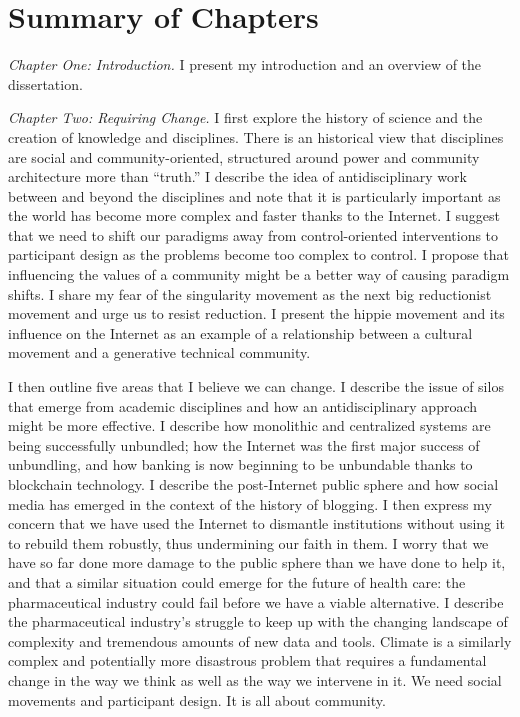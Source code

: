 \section{Summary of Chapters}

\emph{Chapter One: Introduction.} I present my introduction and an overview of the dissertation.

\emph{Chapter Two: Requiring Change.} I first explore the history of science and the creation of knowledge and disciplines. There is an historical view that disciplines are social and community-oriented, structured around power and community architecture more than ``truth.'' I describe the idea of antidisciplinary work between and beyond the disciplines and note that it is particularly important as the world has become more complex and faster thanks to the Internet. I suggest that we need to shift our paradigms away from control-oriented interventions to participant design as the problems become too complex to control. I propose that influencing the values of a community might be a better way of causing paradigm shifts. I share my fear of the singularity movement as the next big reductionist movement and urge us to resist reduction. I present the hippie movement and its influence on the Internet as an example of a relationship between a cultural movement and a generative technical community.

I then outline five areas that I believe we can change. I describe the issue of silos that emerge from academic disciplines and how an antidisciplinary approach might be more effective. I describe how monolithic and centralized systems are being successfully unbundled; how the Internet was the first major success of unbundling, and how banking is now beginning to be unbundable thanks to blockchain technology. I describe the post-Internet public sphere and how social media has emerged in the context of the history of blogging. I then express my concern that we have used the Internet to dismantle institutions without using it to rebuild them robustly, thus undermining our faith in them. I worry that we have so far done more damage to the public sphere than we have done to help it, and that a similar situation could emerge for the future of health care: the pharmaceutical industry could fail before we have a viable alternative. I describe the pharmaceutical industry's struggle to keep up with the changing landscape of complexity and tremendous amounts of new data and tools. Climate is a similarly complex and potentially more disastrous problem that requires a fundamental change in the way we think as well as the way we intervene in it. We need social movements and participant design. It is all about community.

